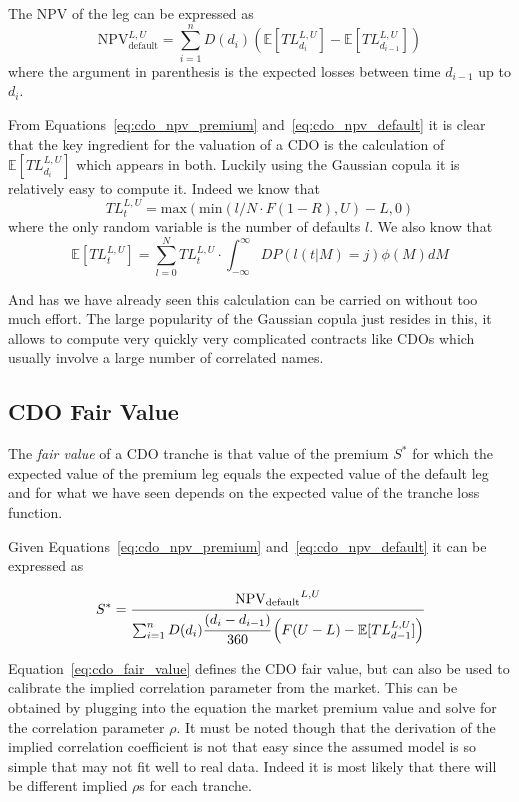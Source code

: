 The NPV of the leg can be expressed as
\begin{equation}
\mathrm{NPV}_{\mathrm{default}}^{L,U}=\sum_{i=1}^{n}D(d_i)\left(\mathbb{E}[TL_{d_i}^{L,U}]-\mathbb{E}[TL_{d_{i-1}}^{L,U}]\right)
\label{eq:cdo_npv_default}
\end{equation}
where the argument in parenthesis is the expected losses between time $d_{i-1}$ up to $d_i$. 

From Equations~\ref{eq:cdo_npv_premium} and~\ref{eq:cdo_npv_default} it is clear that the key ingredient for the valuation of a CDO is the calculation of $\mathbb{E}[TL_{d_i}^{L,U}]$ which appears in both.
Luckily using the Gaussian copula it is relatively easy to compute it. Indeed we know that 
\begin{equation}
TL_{t}^{L,U}=\mathrm{max}(\mathrm{min}(l/N\cdot F(1-R), U)-L, 0)
\label{eq:tl}
\end{equation}
where the only random variable is the number of defaults $l$. We also know that 
\begin{equation}
\mathbb{E}[TL_{t}^{L,U}] = \sum_{l=0}^{N}TL_{t}^{L,U}\cdot \int_{-\infty}^{\infty} DP(l(t|M)=j) \phi(M)dM
\label{eq:etl}
\end{equation}

And has we have already seen this calculation can be carried on without too much effort.
The large popularity of the Gaussian copula just resides in this, it allows to compute very quickly very complicated contracts like CDOs which usually involve a large number of correlated names.

\subsection{CDO Fair Value}
The \emph{fair value} of a CDO tranche is that value of the premium $S^*$ for which the expected value of the premium leg equals the expected value of the default leg and for what we have seen depends on the expected value of the tranche loss function.

Given Equations~\ref{eq:cdo_npv_premium} and~\ref{eq:cdo_npv_default} it can be expressed as

\begin{equation}
S^* = \cfrac{\mathrm{NPV_{default}}^{L,U}}{\sum^{n}_{i=1}D(d_i)\cfrac{(d_i - d_{i-1})}{360}\left(F(U-L)-\mathbb{E}[TL_{d-1}^{L,U}]\right)}
\label{eq:cdo_fair_value}
\end{equation}

Equation~\ref{eq:cdo_fair_value} defines the CDO fair value, but can also be used to calibrate the implied correlation parameter from the market.
This can be obtained by plugging into the equation the market premium value and solve for the correlation parameter $\rho$.
It must be noted though that the derivation of the implied correlation coefficient is not that easy since the assumed model is so simple that may not fit well to real data. Indeed it is most likely that there will be different implied $\rho$s for each tranche.

